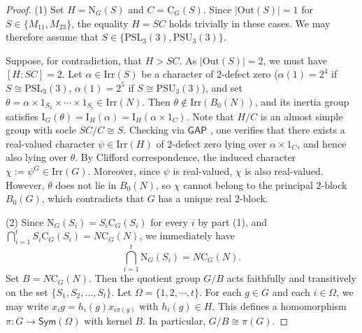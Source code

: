 \documentclass[10pt]{article}
\begin{document}
\begin{proof} 
  (1) Set $H=\mathrm{N}_{G}(S)$ and $C=\mathrm{C}_{G}(S)$. 
  Since $|\mathrm{Out}(S)|=1$ for $S\in \{ M_{11}, M_{23} \}$,
  the equality $H = SC$ holds trivially in these cases.
  We may therefore assume that $S \in \{ \mathrm{PSL}_3(3), \mathrm{PSU}_3(3) \}$.
  
  Suppose, for contradiction, that $H > SC$. As $|\mathrm{Out}(S)| = 2$, we must have $[H : SC] = 2$.    
   Let $\alpha\in \mathrm{Irr}(S)$ be a character of $2$-defect zero ($\alpha(1)=2^4$ if $S\cong \mathrm{PSL}_{3}(3)$, $\alpha(1)=2^5$ if $S\cong \mathrm{PSU}_{3}(3)$), and set
   $\theta=\alpha\times 1_{S_2}\times \cdots \times 1_{S_t}\in \mathrm{Irr}(N)$.
   Then $\theta\notin \mathrm{Irr}(B_0(N))$, and its inertia group satisfies 
   $\mathrm{I}_{G}(\theta)=\mathrm{I}_{H}(\alpha)=\mathrm{I}_{H}(\alpha \times 1_{C})$.
   Note that $H/C$ is an almost simple group with socle $SC/C\cong S$.
   Checking via $\mathsf{GAP}$ \cite{gap}, one verifies that there exists a real-valued character $\psi \in \mathrm{Irr}(H)$ of $2$-defect zero lying over $\alpha \times 1_C$, and hence also lying over $\theta$.
   By Clifford correspondence, the induced character $\chi := \psi^G \in \mathrm{Irr}(G)$. 
   Moreover, since $\psi$ is real-valued, $\chi$ is also real-valued.
   However, $\theta$ does not lie in $B_0(N)$, so $\chi$ cannot belong to the principal $2$-block $B_0(G)$,
   which contradicts that $G$ has a unique real $2$-block. 
   



   (2) 
   Since $\mathrm{N}_{G}(S_i)=S_i \mathrm{C}_{G}(S_i)$ for every $i$ by part (1), and 
   $\bigcap_{i=1}^{t} S_i\mathrm{C}_{G}(S_i)=N \mathrm{C}_{G}(N)$,
   we immediately have 
   $$\bigcap_{i=1}^{t} \mathrm{N}_{G}(S_i)=N \mathrm{C}_{G}(N).$$
    Set $B=N\mathrm{C}_{G}(N)$.
    Then the quotient group $G/B$ acts faithfully and transitively on the set $\{ S_1,S_2,\dots ,S_t \}$.
    Let $\Omega=\{ 1,2,\cdots ,t \}$.
     For each $g \in G$ and each $i \in \Omega$, we may write
    $x_i g = h_i(g) x_{i\pi(g)}$ with $h_i(g) \in H$. 
    This defines a homomorphism $\pi \colon G \to \mathsf{Sym}(\Omega)$ with kernel $B$.
    In particular, $G/B\cong \pi(G)$.



\end{proof}
\end{document}
